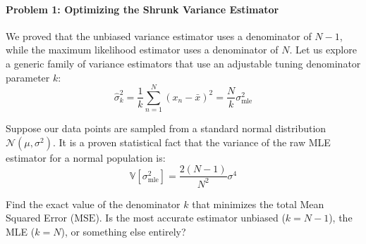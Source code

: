 \documentclass{article}
\begin{document}
\paragraph{Problem 1: Optimizing the Shrunk Variance Estimator}
We proved that the unbiased variance estimator uses a denominator of $N-1$, while the maximum likelihood estimator uses a denominator of $N$. Let us explore a generic family of variance estimators that use an adjustable tuning denominator parameter $k$:
\begin{equation}
\hat{\sigma}^2_k = \frac{1}{k}\sum_{n=1}^{N}(x_n - \bar{x})^2 = \frac{N}{k}\sigma^2_{\text{mle}}
\end{equation}

Suppose our data points are sampled from a standard normal distribution $\mathcal{N}(\mu, \sigma^2)$. It is a proven statistical fact that the variance of the raw MLE estimator for a normal population is:
\begin{equation}
\mathbb{V}\left[\sigma^2_{\text{mle}}\right] = \frac{2(N-1)}{N^2}\sigma^4
\end{equation}

Find the exact value of the denominator $k$ that minimizes the total Mean Squared Error ($\text{MSE}$). Is the most accurate estimator unbiased ($k = N-1$), the MLE ($k = N$), or something else entirely?
\end{document}
